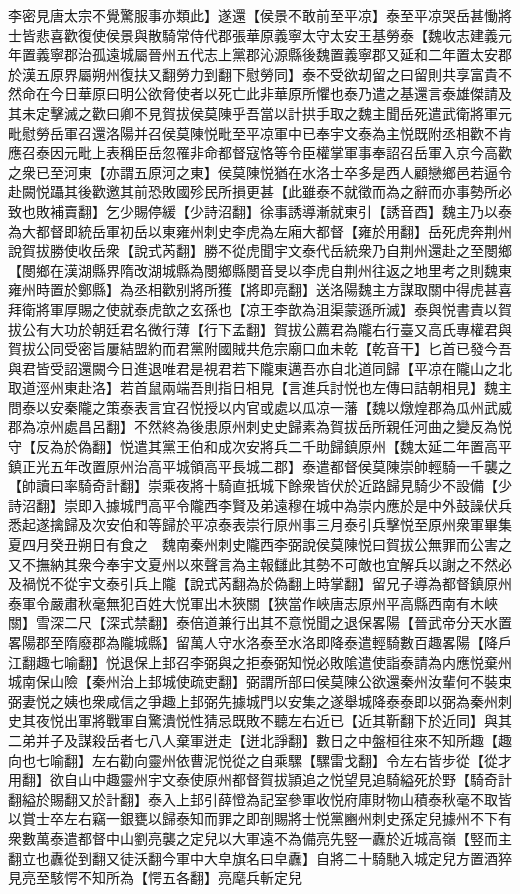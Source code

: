 李密見唐太宗不覺驚服事亦類此】遂還【侯景不敢前至平凉】泰至平凉哭岳甚慟將士皆悲喜歡復使侯景與散騎常侍代郡張華原義寧太守太安王基勞泰【魏收志建義元年置義寧郡治孤遠城屬晉州五代志上黨郡沁源縣後魏置義寧郡又延和二年置太安郡於漢五原界屬朔州復扶又翻勞力到翻下慰勞同】泰不受欲刧留之曰留則共享富貴不然命在今日華原曰明公欲脅使者以死亡此非華原所懼也泰乃遣之基還言泰雄傑請及其未定擊滅之歡曰卿不見賀拔侯莫陳乎吾當以計拱手取之魏主聞岳死遣武衛將軍元毗慰勞岳軍召還洛陽并召侯莫陳悦毗至平凉軍中已奉宇文泰為主悦既附丞相歡不肯應召泰因元毗上表稱臣岳忽罹非命都督寇恪等令臣權掌軍事奉詔召岳軍入京今高歡之衆已至河東【亦謂五原河之東】侯莫陳悦猶在水洛士卒多是西人顧戀鄉邑若逼令赴闕悦躡其後歡邀其前恐敗國殄民所損更甚【此雖泰不就徵而為之辭而亦事勢所必致也敗補賣翻】乞少賜停緩【少詩沼翻】徐事誘導漸就東引【誘音酉】魏主乃以泰為大都督即統岳軍初岳以東雍州刺史李虎為左廂大都督【雍於用翻】岳死虎奔荆州說賀拔勝使收岳衆【說式芮翻】勝不從虎聞宇文泰代岳統衆乃自荆州還赴之至閿鄉【閿鄉在漢湖縣界隋改湖城縣為閿鄉縣閿音旻以李虎自荆州往返之地里考之則魏東雍州時置於鄭縣】為丞相歡别將所獲【將即亮翻】送洛陽魏主方謀取關中得虎甚喜拜衛將軍厚賜之使就泰虎歆之玄孫也【凉王李歆為沮渠蒙遜所滅】泰與悦書責以賀拔公有大功於朝廷君名微行薄【行下孟翻】賀拔公薦君為隴右行臺又高氏專權君與賀拔公同受密旨屢結盟約而君黨附國賊共危宗廟口血未乾【乾音干】匕首已發今吾與君皆受詔還闕今日進退唯君是視君若下隴東邁吾亦自北道同歸【平凉在隴山之北取道涇州東赴洛】若首鼠兩端吾則指日相見【言進兵討悦也左傳曰詰朝相見】魏主問泰以安秦隴之策泰表言宜召悦授以内官或處以瓜凉一藩【魏以燉煌郡為瓜州武威郡為凉州處昌呂翻】不然終為後患原州刺史史歸素為賀拔岳所親任河曲之變反為悦守【反為於偽翻】悦遣其黨王伯和成次安將兵二千助歸鎮原州【魏太延二年置高平鎮正光五年改置原州治高平城領高平長城二郡】泰遣都督侯莫陳崇帥輕騎一千襲之【帥讀曰率騎奇計翻】崇乘夜將十騎直扺城下餘衆皆伏於近路歸見騎少不設備【少詩沼翻】崇即入據城門高平令隴西李賢及弟遠穆在城中為崇内應於是中外鼓譟伏兵悉起遂擒歸及次安伯和等歸於平凉泰表崇行原州事三月泰引兵擊悦至原州衆軍畢集　夏四月癸丑朔日有食之　魏南秦州刺史隴西李弼說侯莫陳悦曰賀拔公無罪而公害之又不撫納其衆今奉宇文夏州以來聲言為主報讎此其勢不可敵也宜解兵以謝之不然必及禍悦不從宇文泰引兵上隴【說式芮翻為於偽翻上時掌翻】留兄子導為都督鎮原州泰軍令嚴肅秋毫無犯百姓大悦軍出木狹關【狹當作峽唐志原州平高縣西南有木峽關】雪深二尺【深式禁翻】泰倍道兼行出其不意悦聞之退保畧陽【晉武帝分天水置畧陽郡至隋廢郡為隴城縣】留萬人守水洛泰至水洛即降泰遣輕騎數百趣畧陽【降戶江翻趣七喻翻】悦退保上邽召李弼與之拒泰弼知悦必敗隂遣使詣泰請為内應悦棄州城南保山險【秦州治上邽城使疏吏翻】弼謂所部曰侯莫陳公欲還秦州汝輩何不裝束弼妻悦之姨也衆咸信之爭趣上邽弼先據城門以安集之遂舉城降泰泰即以弼為秦州刺史其夜悦出軍將戰軍自驚潰悦性猜忌既敗不聽左右近已【近其靳翻下於近同】與其二弟并子及謀殺岳者七八人棄軍迸走【迸北諍翻】數日之中盤桓往來不知所趣【趣向也七喻翻】左右勸向靈州依曹泥悦從之自乘騾【騾雷戈翻】令左右皆步從【從才用翻】欲自山中趣靈州宇文泰使原州都督賀拔頴追之悦望見追騎縊死於野【騎奇計翻縊於賜翻又於計翻】泰入上邽引薛憕為記室參軍收悦府庫財物山積泰秋毫不取皆以賞士卒左右竊一銀甕以歸泰知而罪之即剖賜將士悦黨豳州刺史孫定兒據州不下有衆數萬泰遣都督中山劉亮襲之定兒以大軍遠不為備亮先竪一纛於近城高嶺【竪而主翻立也纛從到翻又徒沃翻今軍中大皁旗名曰皁纛】自將二十騎馳入城定兒方置酒猝見亮至駭愕不知所為【愕五各翻】亮麾兵斬定兒